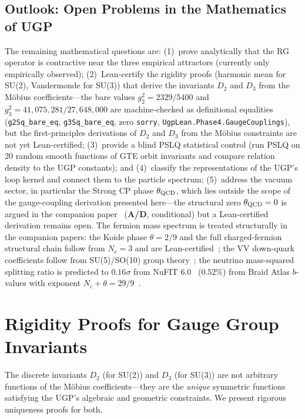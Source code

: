 \documentclass[11pt,twocolumn]{article}
\begin{document}
\subsection{Outlook: Open Problems in the Mathematics of UGP}
The remaining mathematical questions are: (1)~prove analytically that the RG operator is contractive near the three empirical attractors (currently only empirically observed); (2)~Lean-certify the rigidity proofs (harmonic mean for SU(2), Vandermonde for SU(3)) that derive the invariants $D_2$ and $D_3$ from the Möbius coefficients---the bare values $g_2^2=2329/5400$ and $g_3^2=41{,}075{,}281/27{,}648{,}000$ are machine-checked as definitional equalities (\texttt{g2Sq\_bare\_eq}, \texttt{g3Sq\_bare\_eq}, zero \texttt{sorry}, \texttt{UgpLean.Phase4.GaugeCouplings}), but the first-principles derivations of $D_2$ and $D_3$ from the Möbius constraints are not yet Lean-certified; (3)~provide a blind PSLQ statistical control (run PSLQ on 20 random smooth functions of GTE orbit invariants and compare relation density to the UGP constants); and (4)~classify the representations of the UGP's loop kernel and connect them to the particle spectrum; (5)~address the vacuum sector, in particular the Strong CP phase $\theta_{\rm QCD}$, which lies outside the scope of the gauge-coupling derivation presented here---the structural zero $\theta_{\rm QCD}=0$ is argued in the companion paper~\cite{Spivack2026_SM_UGP} (\textbf{A/D}, conditional) but a Lean-certified derivation remains open.  The fermion mass spectrum is treated structurally in the companion papers: the Koide phase $\theta = 2/9$ and the full charged-fermion structural chain follow from $N_c = 3$ and are Lean-certified~\cite{Spivack2026_Koide}; the VV down-quark coefficients follow from SU(5)/SO(10) group theory~\cite{Spivack2026_CyclotomicMass}; the neutrino mass-squared splitting ratio is predicted to $0.16\sigma$ from NuFIT 6.0~\cite{NuFIT60} ($0.52\%$) from Braid Atlas $b$-values with exponent $N_c + \theta = 29/9$~\cite{Spivack2026_SM_UGP}.

\FloatBarrier
\clearpage
\appendix

\section{Rigidity Proofs for Gauge Group Invariants}
\label{app:rigidity_proofs}

The discrete invariants $D_2$ (for SU(2)) and $D_3$ (for SU(3)) are not arbitrary functions of the Möbius coefficients—they are the \emph{unique} symmetric functions satisfying the UGP's algebraic and geometric constraints. We present rigorous uniqueness proofs for both.
\end{document}
